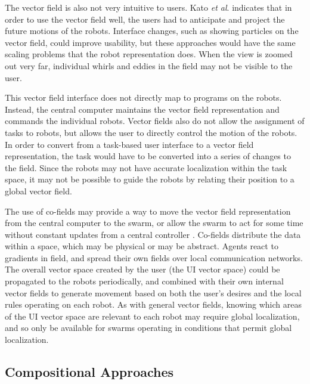 The vector field is also not very intuitive to users. 
Kato \emph{et al}. indicates that in order to use the vector field well, the users had to anticipate and project the future motions of the robots. 
Interface changes, such as showing particles on the vector field, could improve usability, but these approaches would have the same scaling problems that the robot representation does. 
When the view is zoomed out very far, individual whirls and eddies in the field may not be visible to the user. 

This vector field interface does not directly map to programs on the robots. 
Instead, the central computer maintains the vector field representation and commands the individual robots.
Vector fields also do not allow the assignment of tasks to robots, but allows the user to directly control the motion of the robots. 
In order to convert from a task-based user interface to a vector field representation, the task would have to be converted into a series of changes to the field.
Since the robots may not have accurate localization within the task space, it may not be possible to guide the robots by relating their position to a global vector field. 

The use of co-fields may provide a way to move the vector field representation from the central computer to the swarm, or allow the swarm to act for some time without constant updates from a central controller \citep{mamei2003co}.
Co-fields distribute the data within a space, which may be physical or may be abstract. 
Agents react to gradients in field, and spread their own fields over local communication networks. 
The overall vector space created by the user (the UI vector space) could be propagated to the robots periodically, and combined with their own internal vector fields to generate movement based on both the user's desires and the local rules operating on each robot. 
As with general vector fields, knowing which areas of the UI vector space are relevant to each robot may require global localization, and so only be available for swarms operating in conditions that permit global localization. 

\subsection{Compositional Approaches}

